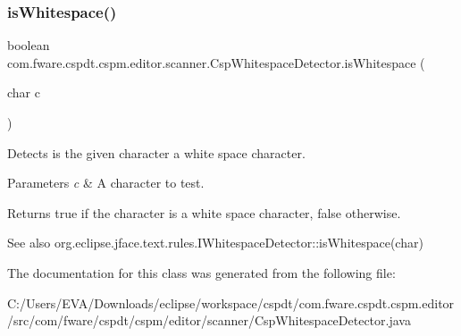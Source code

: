 \subsubsection{\texorpdfstring{is\+Whitespace()}{isWhitespace()}}
{\footnotesize\ttfamily boolean com.\+fware.\+cspdt.\+cspm.\+editor.\+scanner.\+Csp\+Whitespace\+Detector.\+is\+Whitespace (\begin{DoxyParamCaption}\item[{char}]{c }\end{DoxyParamCaption})\hspace{0.3cm}{\ttfamily [inline]}}



Detects is the given character a white space character. 


\begin{DoxyParams}{Parameters}
{\em c} & A character to test.\\
\hline
\end{DoxyParams}
\begin{DoxyReturn}{Returns}
{\ttfamily true} if the character is a white space character, {\ttfamily false} otherwise.
\end{DoxyReturn}
\begin{DoxySeeAlso}{See also}
org.\+eclipse.\+jface.\+text.\+rules.\+I\+Whitespace\+Detector\+::is\+Whitespace(char) 
\end{DoxySeeAlso}


The documentation for this class was generated from the following file\+:\begin{DoxyCompactItemize}
\item 
C\+:/\+Users/\+E\+V\+A/\+Downloads/eclipse/workspace/cspdt/com.\+fware.\+cspdt.\+cspm.\+editor/src/com/fware/cspdt/cspm/editor/scanner/Csp\+Whitespace\+Detector.\+java\end{DoxyCompactItemize}
